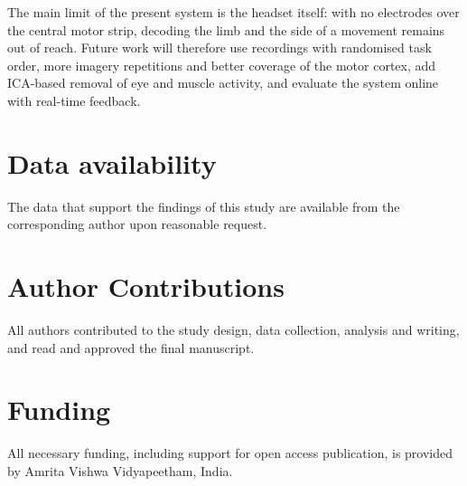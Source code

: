 \documentclass[pdflatex,sn-mathphys-num]{sn-jnl}%
\theoremstyle{thmstyleone}%
\theoremstyle{thmstyletwo}%
\theoremstyle{thmstylethree}%
\begin{document}
The main limit of the present system is the headset itself: with no electrodes over the central motor strip, decoding the limb and the side of a movement remains out of reach. Future work will therefore use recordings with randomised task order, more imagery repetitions and better coverage of the motor cortex, add ICA-based removal of eye and muscle activity, and evaluate the system online with real-time feedback.

\section{Data availability}
The data that support the findings of this study are available from the corresponding author upon reasonable request.

\section{Author Contributions}
All authors contributed to the study design, data collection, analysis and writing, and read and approved the final manuscript.

\section{Funding}
All necessary funding, including support for open access publication, is provided by Amrita Vishwa Vidyapeetham, India.



\end{document}
